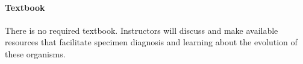 \documentclass[11pt]{article}
\begin{document}
\paragraph{Textbook} %
There is no required textbook. Instructors will discuss and make available resources that facilitate specimen diagnosis and learning about the evolution of these organisms.
\end{document}
